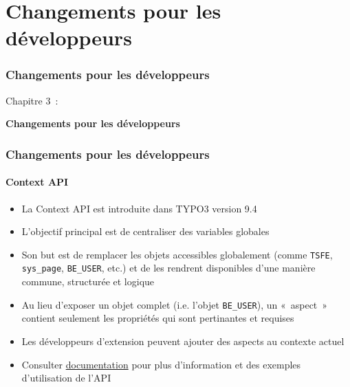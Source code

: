 %

\section{Changements pour les développeurs}
\begin{frame}[fragile]
	\frametitle{Changements pour les développeurs}

	\begin{center}\huge{Chapitre 3~:}\end{center}
	\begin{center}\huge{\color{typo3darkgrey}\textbf{Changements pour les développeurs}}\end{center}

\end{frame}


\begin{frame}[fragile]
	\frametitle{Changements pour les développeurs}
	\framesubtitle{Context API}

	\begin{itemize}
		\item La Context API est introduite dans TYPO3 version 9.4
		\item L'objectif principal est de centraliser des variables globales
		\item Son but est de remplacer les objets accessibles globalement (comme
			\texttt{TSFE}, \texttt{sys\_page}, \texttt{BE\_USER}, etc.) et de
			les rendrent disponibles d'une manière commune, structurée et logique
		\item Au lieu d'exposer un objet complet (i.e. l'objet \texttt{BE\_USER}),
			un «~aspect~» contient seulement les propriétés qui sont pertinantes
			et requises
		\item Les développeurs d'extension peuvent ajouter des aspects au contexte actuel
		\item Consulter \href{https://docs.typo3.org/typo3cms/extensions/core/latest/Changelog/9.4/Feature-85389-ContextAPIForConsistentDataHandling.html}{documentation}
			pour plus d'information et des exemples d'utilisation de l'API
	\end{itemize}

\end{frame}

